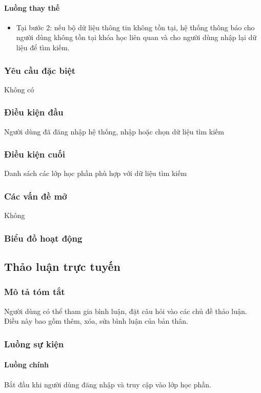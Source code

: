 \documentclass[./../main_file.tex]{subfiles}
\begin{document}
\paragraph{Luồng thay thế}
\begin{itemize}
	\item Tại bước 2: nếu bộ dữ liệu thông tin không tồn tại, hệ thống thông báo cho người dùng không tồn tại khóa học liên quan và cho người dùng nhập lại dữ liệu để tìm kiếm.
\end{itemize}
\subsubsection{Yêu cầu đặc biệt}
Không có

\subsubsection{Điều kiện đầu}
Người dùng đã đăng nhập hệ thống, nhập hoặc chọn dữ liệu tìm kiếm

\subsubsection{Điều kiện cuối}
Danh sách các lớp học phần phù hợp với dữ liệu tìm kiếm

\subsubsection{Các vấn đề mở}
Không

\subsubsection{Biểu đồ hoạt động}

\subsection{Thảo luận trực tuyến}
\subsubsection{Mô tả tóm tắt}
Người dùng có thể tham gia bình luận, đặt câu hỏi vào các chủ đề thảo luận. Điều này bao gồm thêm, xóa, sửa bình luận của bản thân.

\subsubsection{Luồng sự kiện}
\paragraph{Luồng chính}
Bắt đầu khi người dùng đăng nhập và truy cập vào lớp học phần.
\end{document}
